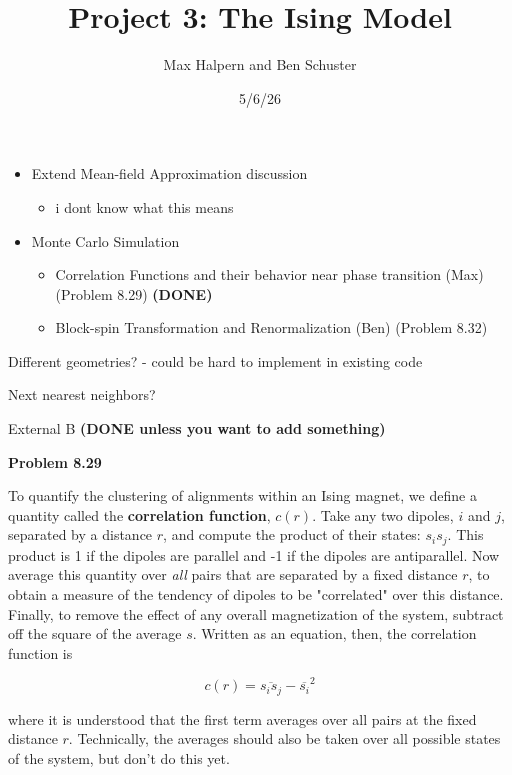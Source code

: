 \documentclass[12pt, letterpaper]{article}
\title{Project 3: The Ising Model}
\author{Max Halpern and Ben Schuster}
\date{5/6/26}
\begin{document}
\maketitle

\begin{itemize}
	\item Extend Mean-field Approximation discussion
	\begin{itemize}
		\item i dont know what this means
	\end{itemize}
	\item Monte Carlo Simulation
	\begin{itemize}
		\item Correlation Functions and their behavior near phase transition (Max) (Problem 8.29) \textbf{(DONE)}
		\item Block-spin Transformation and Renormalization (Ben) (Problem 8.32)
	\end{itemize}
\end{itemize}

Different geometries? - could be hard to implement in existing code

Next nearest neighbors?

External B \textbf{(DONE unless you want to add something)}

\textbf{Problem 8.29}

To quantify the clustering of alignments within an Ising magnet, we define a quantity called the \textbf{correlation function}, $c(r)$. Take any two dipoles, $i$ and $j$, separated by a distance $r$, and compute the product of their states: $s_i s_j$. This product is 1 if the dipoles are parallel and -1 if the dipoles are antiparallel. Now average this quantity over \textit{all} pairs that are separated by a fixed distance $r$, to obtain a measure of the tendency of dipoles to be "correlated" over this distance. Finally, to remove the effect of any overall magnetization of the system, subtract off the square of the average $s$. Written as an equation, then, the correlation function is

\begin{equation*}
	c(r) = \overline{s_i s_j} - \overline{s_i}^2
\end{equation*}

where it is understood that the first term averages over all pairs at the fixed distance $r$. Technically, the averages should also be taken over all possible states of the system, but don't do this yet. 
\end{document}
